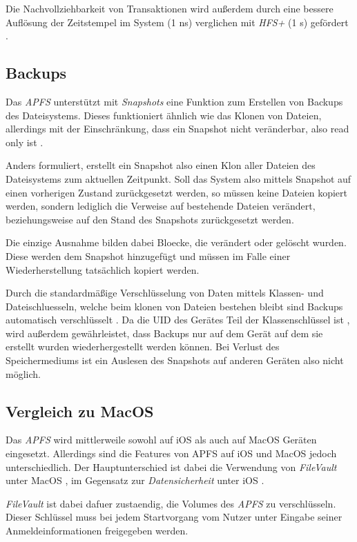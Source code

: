 Die Nachvollziehbarkeit von Transaktionen wird außerdem durch eine bessere
Auflösung der Zeitstempel im System (1 ns) verglichen mit \textit{HFS+} (1 s)
gefördert \cite{arstechnica}.


\subsection{Backups}
Das \textit{APFS} unterstützt mit \textit{Snapshots} eine Funktion zum Erstellen
von Backups des Dateisystems. Dieses funktioniert ähnlich wie das Klonen von
Dateien, allerdings mit der Einschränkung, dass ein Snapshot nicht veränderbar,
also read only ist \cite{arstechnica}.

Anders formuliert, erstellt ein Snapshot also einen Klon aller Dateien des
Dateisystems zum aktuellen Zeitpunkt. Soll das System also mittels Snapshot auf
einen vorherigen Zustand zurückgesetzt werden, so müssen keine Dateien kopiert
werden, sondern lediglich die Verweise auf bestehende Dateien verändert,
beziehungsweise auf den Stand des Snapshots zurückgesetzt werden.

Die einzige Ausnahme bilden dabei Bloecke, die verändert
oder gelöscht wurden. Diese werden dem Snapshot hinzugefügt und müssen im Falle
einer Wiederherstellung tatsächlich kopiert werden.

Durch die standardmäßige Verschlüsselung von Daten mittels Klassen- und
Dateischluesseln, welche beim klonen von Dateien bestehen bleibt sind Backups
automatisch verschlüsselt \cite[S. 50]{apple2020}. Da die UID des Gerätes Teil
der Klassenschlüssel ist \cite[S. 50]{apple2020}, wird außerdem gewährleistet,
dass Backups nur auf dem Gerät auf dem sie erstellt wurden wiederhergestellt
werden können. Bei Verlust des Speichermediums ist ein Auslesen des Snapshots
auf anderen Geräten also nicht möglich.


\subsection{Vergleich zu MacOS}
Das \textit{APFS} wird mittlerweile sowohl auf iOS als auch auf MacOS Geräten
eingesetzt. Allerdings sind die Features von APFS auf iOS und MacOS jedoch
unterschiedlich. Der Hauptunterschied ist dabei die Verwendung von
\textit{FileVault} unter MacOS \cite[S. 56 ff]{apple2020}, im Gegensatz zur
\textit{Datensicherheit} unter iOS \cite[S. 48 ff]{apple2020}.

\textit{FileVault} ist dabei dafuer zustaendig, die Volumes des \textit{APFS} zu
verschlüsseln. Dieser Schlüssel muss bei jedem Startvorgang vom Nutzer unter
Eingabe seiner Anmeldeinformationen freigegeben werden.

